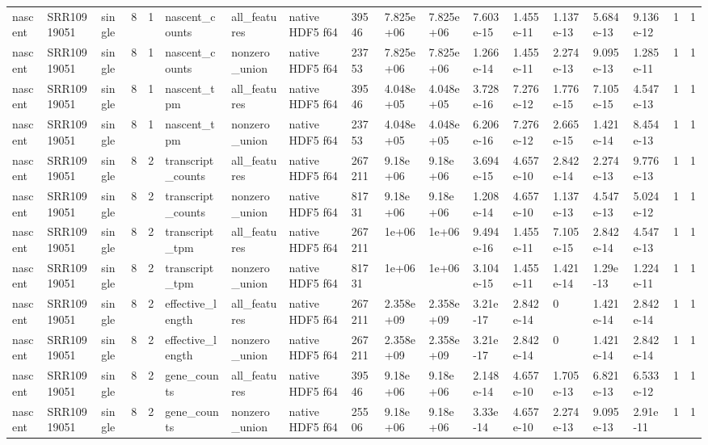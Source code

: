 \begin{tabular}{llllllllllllllllll}
nascent & SRR10919051 & single & 8 & 1 & nascent\_counts & all\_features & native HDF5 f64 & 39546 & 7.825e+06 & 7.825e+06 & 7.603e-15 & 1.455e-11 & 1.137e-13 & 5.684e-13 & 9.136e-12 & 1 & 1 \\
nascent & SRR10919051 & single & 8 & 1 & nascent\_counts & nonzero\_union & native HDF5 f64 & 23753 & 7.825e+06 & 7.825e+06 & 1.266e-14 & 1.455e-11 & 2.274e-13 & 9.095e-13 & 1.285e-11 & 1 & 1 \\
nascent & SRR10919051 & single & 8 & 1 & nascent\_tpm & all\_features & native HDF5 f64 & 39546 & 4.048e+05 & 4.048e+05 & 3.728e-16 & 7.276e-12 & 1.776e-15 & 7.105e-15 & 4.547e-13 & 1 & 1 \\
nascent & SRR10919051 & single & 8 & 1 & nascent\_tpm & nonzero\_union & native HDF5 f64 & 23753 & 4.048e+05 & 4.048e+05 & 6.206e-16 & 7.276e-12 & 2.665e-15 & 1.421e-14 & 8.454e-13 & 1 & 1 \\
nascent & SRR10919051 & single & 8 & 2 & transcript\_counts & all\_features & native HDF5 f64 & 267211 & 9.18e+06 & 9.18e+06 & 3.694e-15 & 4.657e-10 & 2.842e-14 & 2.274e-13 & 9.776e-13 & 1 & 1 \\
nascent & SRR10919051 & single & 8 & 2 & transcript\_counts & nonzero\_union & native HDF5 f64 & 81731 & 9.18e+06 & 9.18e+06 & 1.208e-14 & 4.657e-10 & 1.137e-13 & 4.547e-13 & 5.024e-12 & 1 & 1 \\
nascent & SRR10919051 & single & 8 & 2 & transcript\_tpm & all\_features & native HDF5 f64 & 267211 & 1e+06 & 1e+06 & 9.494e-16 & 1.455e-11 & 7.105e-15 & 2.842e-14 & 4.547e-13 & 1 & 1 \\
nascent & SRR10919051 & single & 8 & 2 & transcript\_tpm & nonzero\_union & native HDF5 f64 & 81731 & 1e+06 & 1e+06 & 3.104e-15 & 1.455e-11 & 1.421e-14 & 1.29e-13 & 1.224e-11 & 1 & 1 \\
nascent & SRR10919051 & single & 8 & 2 & effective\_length & all\_features & native HDF5 f64 & 267211 & 2.358e+09 & 2.358e+09 & 3.21e-17 & 2.842e-14 & 0 & 1.421e-14 & 2.842e-14 & 1 & 1 \\
nascent & SRR10919051 & single & 8 & 2 & effective\_length & nonzero\_union & native HDF5 f64 & 267211 & 2.358e+09 & 2.358e+09 & 3.21e-17 & 2.842e-14 & 0 & 1.421e-14 & 2.842e-14 & 1 & 1 \\
nascent & SRR10919051 & single & 8 & 2 & gene\_counts & all\_features & native HDF5 f64 & 39546 & 9.18e+06 & 9.18e+06 & 2.148e-14 & 4.657e-10 & 1.705e-13 & 6.821e-13 & 6.533e-12 & 1 & 1 \\
nascent & SRR10919051 & single & 8 & 2 & gene\_counts & nonzero\_union & native HDF5 f64 & 25506 & 9.18e+06 & 9.18e+06 & 3.33e-14 & 4.657e-10 & 2.274e-13 & 9.095e-13 & 2.91e-11 & 1 & 1 \\

\end{tabular}

